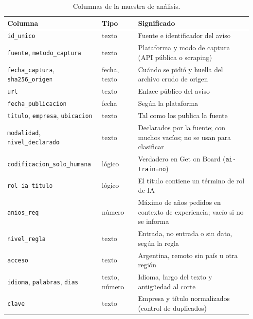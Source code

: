\documentclass[11pt,a4paper]{article}
\begin{document}
\begin{table}[H]
\centering\small
\begin{tabularx}{\textwidth}{L{4.7cm} L{1.9cm} X}
\toprule
\textbf{Columna} & \textbf{Tipo} & \textbf{Significado}\\
\midrule
\texttt{id\_unico} & texto & Fuente e identificador del aviso\\
\texttt{fuente}, \texttt{metodo\_captura} & texto & Plataforma y modo de captura (API pública o scraping)\\
\texttt{fecha\_captura}, \texttt{sha256\_origen} & fecha, texto & Cuándo se pidió y huella del archivo crudo de origen\\
\texttt{url} & texto & Enlace público del aviso\\
\texttt{fecha\_publicacion} & fecha & Según la plataforma\\
\texttt{titulo}, \texttt{empresa}, \texttt{ubicacion} & texto & Tal como los publica la fuente\\
\texttt{modalidad}, \texttt{nivel\_declarado} & texto & Declarados por la fuente; con muchos vacíos; no se usan para clasificar\\
\texttt{codificacion\_solo\_humana} & lógico & Verdadero en Get on Board (\texttt{ai-train=no})\\
\texttt{rol\_ia\_titulo} & lógico & El título contiene un término de rol de IA\\
\texttt{anios\_req} & número & Máximo de años pedidos en contexto de experiencia; vacío si no se informa\\
\texttt{nivel\_regla} & texto & Entrada, no entrada o sin dato, según la regla\\
\texttt{acceso} & texto & Argentina, remoto sin país u otra región\\
\texttt{idioma}, \texttt{palabras}, \texttt{dias} & texto, número & Idioma, largo del texto y antigüedad al corte\\
\texttt{clave} & texto & Empresa y título normalizados (control de duplicados)\\
\bottomrule
\end{tabularx}
\caption{Columnas de la muestra de análisis.}
\end{table}
\end{document}
